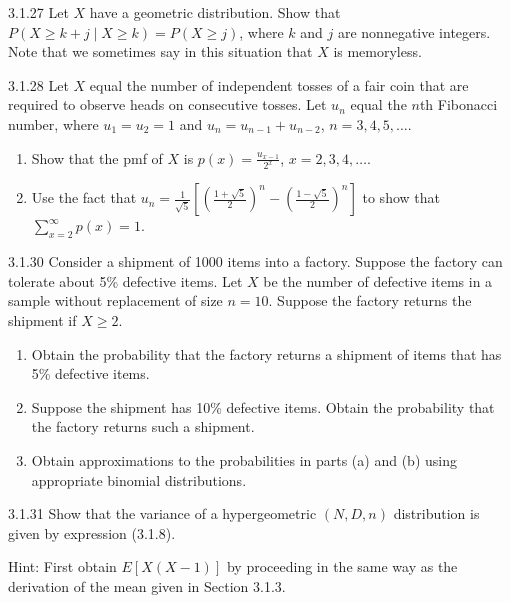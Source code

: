 \begin{exercise}{3.1.27}
Let $X$ have a geometric distribution. Show that $P(X \geq k+j \mid X \geq k) = P(X \geq j)$, where $k$ and $j$ are nonnegative integers. Note that we sometimes say in this situation that $X$ is memoryless.
\end{exercise}

\begin{exercise}{3.1.28}
Let $X$ equal the number of independent tosses of a fair coin that are required to observe heads on consecutive tosses. Let $u_n$ equal the $n$th Fibonacci number, where $u_1 = u_2 = 1$ and $u_n = u_{n-1} + u_{n-2}$, $n = 3, 4, 5, \ldots$.
\begin{enumerate}
\item Show that the pmf of $X$ is $p(x) = \frac{u_{x-1}}{2^x}$, $x = 2, 3, 4, \ldots$.
\item Use the fact that $u_n = \frac{1}{\sqrt{5}}\left[\left(\frac{1+\sqrt{5}}{2}\right)^n - \left(\frac{1-\sqrt{5}}{2}\right)^n\right]$ to show that $\sum_{x=2}^{\infty} p(x) = 1$.
\end{enumerate}
\end{exercise}

\begin{exercise}{3.1.30}
Consider a shipment of 1000 items into a factory. Suppose the factory can tolerate about 5\% defective items. Let $X$ be the number of defective items in a sample without replacement of size $n = 10$. Suppose the factory returns the shipment if $X \geq 2$.
\begin{enumerate}
\item Obtain the probability that the factory returns a shipment of items that has 5\% defective items.
\item Suppose the shipment has 10\% defective items. Obtain the probability that the factory returns such a shipment.
\item Obtain approximations to the probabilities in parts (a) and (b) using appropriate binomial distributions.
\end{enumerate}
\end{exercise}

\begin{exercise}{3.1.31}
Show that the variance of a hypergeometric $(N, D, n)$ distribution is given by expression (3.1.8).

Hint: First obtain $E[X(X-1)]$ by proceeding in the same way as the derivation of the mean given in Section 3.1.3.
\end{exercise}

